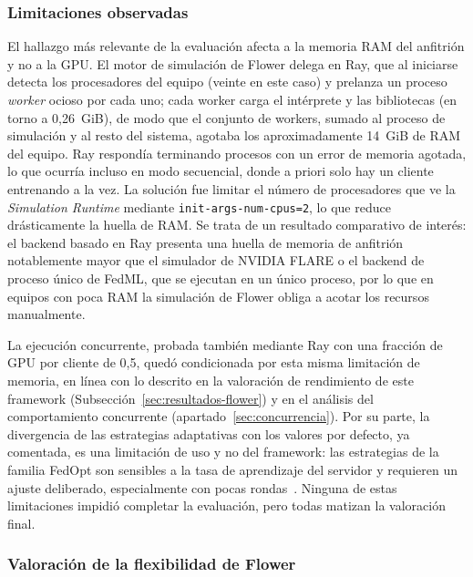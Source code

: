 \subsubsection{Limitaciones observadas}\label{subsec:flex-flower-lim}

El hallazgo más relevante de la evaluación afecta a la memoria RAM del anfitrión y
no a la GPU. El motor de simulación de Flower delega en Ray, que al iniciarse
detecta los procesadores del equipo (veinte en este caso) y prelanza un proceso
\textit{worker} ocioso por cada uno; cada worker carga el intérprete y las
bibliotecas (en torno a 0,26~GiB), de modo que el conjunto de workers, sumado al
proceso de simulación y al resto del sistema, agotaba los aproximadamente 14~GiB
de RAM del equipo. Ray respondía terminando procesos con un error de memoria
agotada, lo que ocurría incluso en modo secuencial, donde a priori solo hay un
cliente entrenando a la vez. La solución fue limitar el número de procesadores que
ve la \textit{Simulation Runtime} mediante \texttt{init-args-num-cpus=2}, lo que
reduce drásticamente la huella de RAM. Se trata de un resultado comparativo de
interés: el backend basado en Ray presenta una huella de memoria de anfitrión
notablemente mayor que el simulador de NVIDIA FLARE o el backend de proceso único
de FedML, que se ejecutan en un único proceso, por lo que en equipos con poca RAM
la simulación de Flower obliga a acotar los recursos manualmente.

La ejecución concurrente, probada también mediante Ray con una fracción de GPU por
cliente de 0,5, quedó condicionada por esta misma limitación de memoria, en línea
con lo descrito en la valoración de rendimiento de este framework
(Subsección~\ref{sec:resultados-flower}) y en el análisis del comportamiento
concurrente (apartado~\ref{sec:concurrencia}). Por su parte, la divergencia de las
estrategias adaptativas con los valores por defecto, ya comentada, es una limitación
de uso y no del framework: las estrategias de la familia FedOpt son sensibles a la
tasa de aprendizaje del servidor y requieren un ajuste deliberado, especialmente con
pocas rondas~\parencite{reddi2021adaptive}. Ninguna de estas limitaciones impidió
completar la evaluación, pero todas matizan la valoración final.

\subsubsection{Valoración de la flexibilidad de Flower}\label{subsec:flex-flower-score}

